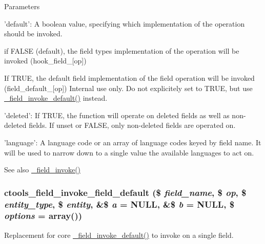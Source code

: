 \begin{DoxyParams}{Parameters}
\begin{DoxyItemize}
\item 'default': A boolean value, specifying which implementation of the operation should be invoked.
\begin{DoxyItemize}
\item if FALSE (default), the field types implementation of the operation will be invoked (hook\_\-field\_\-\mbox{[}op\mbox{]})
\item If TRUE, the default field implementation of the field operation will be invoked (field\_\-default\_\-\mbox{[}op\mbox{]}) Internal use only. Do not explicitely set to TRUE, but use \hyperlink{group__field__attach_gaf000872e1850750f98445dfa96bfb602}{\_\-field\_\-invoke\_\-default()} instead.
\end{DoxyItemize}
\item 'deleted': If TRUE, the function will operate on deleted fields as well as non-\/deleted fields. If unset or FALSE, only non-\/deleted fields are operated on.
\item 'language': A language code or an array of language codes keyed by field name. It will be used to narrow down to a single value the available languages to act on.
\end{DoxyItemize}\end{DoxyParams}
\begin{DoxySeeAlso}{See also}
\hyperlink{group__field__attach_ga65f891a5eea6513f8505f5cfc5894896}{\_\-field\_\-invoke()} 
\end{DoxySeeAlso}
\hypertarget{fields_8inc_a0c7f122d4f06bf0276adccf59a47d6f4}{
\subsubsection[{ctools\_\-field\_\-invoke\_\-field\_\-default}]{\setlength{\rightskip}{0pt plus 5cm}ctools\_\-field\_\-invoke\_\-field\_\-default (\$ {\em field\_\-name}, \/  \$ {\em op}, \/  \$ {\em entity\_\-type}, \/  \$ {\em entity}, \/  \&\$ {\em a} = {\ttfamily NULL}, \/  \&\$ {\em b} = {\ttfamily NULL}, \/  \$ {\em options} = {\ttfamily array()})}}
\label{fields_8inc_a0c7f122d4f06bf0276adccf59a47d6f4}
Replacement for core \hyperlink{group__field__attach_gaf000872e1850750f98445dfa96bfb602}{\_\-field\_\-invoke\_\-default()} to invoke on a single field.

